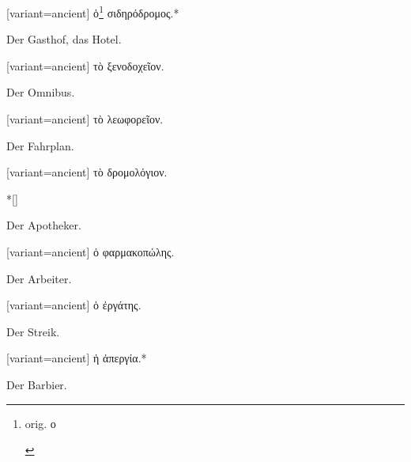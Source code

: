 \begin{greek}[variant=ancient]%
ὁ\footnote{\begin{latin}%
orig. \textgreek[variant=ancient]{ο}\end{latin}%
} σιδηρόδρομος.{*}

\end{greek}%
\switchcolumn*

Der Gasthof, das Hotel.

\switchcolumn

\begin{greek}[variant=ancient]%
τὸ ξενοδοχεῖον.

\end{greek}%
\switchcolumn*

Der Omnibus.

\switchcolumn

\begin{greek}[variant=ancient]%
τὸ λεωφορεῖον.

\end{greek}%
\switchcolumn*

Der Fahrplan. 

\switchcolumn

\begin{greek}[variant=ancient]%
τὸ δρομολόγιον.

\end{greek}%
\switchcolumn[0]*[\StarOrnament]

Der Apotheker.

\switchcolumn

\begin{greek}[variant=ancient]%
ὁ φαρμακοπώλης.

\end{greek}%
\switchcolumn*

Der Arbeiter.

\switchcolumn

\begin{greek}[variant=ancient]%
ὁ ἐργάτης.

\end{greek}%
\switchcolumn*

Der Streik.

\switchcolumn

\begin{greek}[variant=ancient]%
ἡ ἀπεργία.{*}

\end{greek}%
\switchcolumn*

Der Barbier.

\switchcolumn

